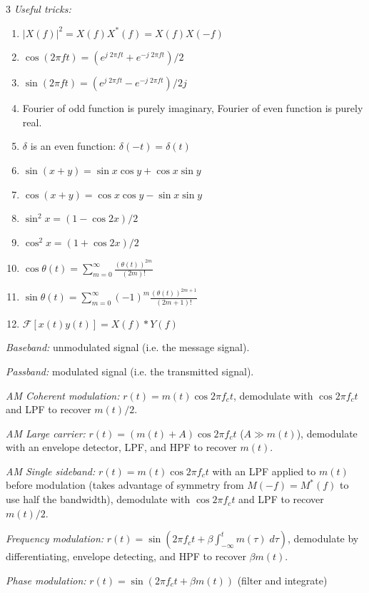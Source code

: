 \documentclass[9pt]{article}
\newcommand{\abs}[1]{\left\vert #1 \right\vert}
\newcommand{\F}{\mathcal{F}}
\begin{document}
\begin{multicols}{3}
\emph{Useful tricks:}
\begin{enumerate}
    \item $\abs{X(f)}^2 = X(f) X^*(f) = X(f) X(-f)$
    \item $\cos(2\pi f t) = (e^{j\; 2\pi f t} + e^{-j\; 2\pi f t})/2$
    \item $\sin(2\pi f t) = (e^{j\; 2\pi f t} - e^{-j\; 2\pi f t})/2j$
    \item Fourier of odd function is purely imaginary, Fourier of even function is purely real.
    \item $\delta$ is an even function: $\delta(-t) = \delta(t)$
    \item $\sin(x + y) = \sin x \cos y + \cos x \sin y$
    \item $\cos(x + y) = \cos x \cos y - \sin x \sin y$
    \item $\sin^2 x = (1 - \cos 2 x)/2$
    \item $\cos^2 x = (1 + \cos 2x)/ 2$
    \item $\cos \theta(t) = \sum_{m=0}^{\infty} \frac{(\theta(t))^{2m}}{(2m)!}$
    \item $\sin \theta(t) = \sum_{m=0}^{\infty} (-1)^m \frac{(\theta(t))^{2m+1}}{(2m + 1)!}$
    \item $\F[x(t)y(t)] = X(f) * Y(f)$
\end{enumerate}

\emph{Baseband:} unmodulated signal (i.e. the message signal).

\emph{Passband:} modulated signal (i.e. the transmitted signal).

\emph{AM Coherent modulation:} $r(t) = m(t) \cos 2\pi f_c t$, demodulate with $\cos 2\pi f_c t$ and LPF to recover $m(t)/2$.

\emph{AM Large carrier:} $r(t) = (m(t) + A) \cos 2\pi f_c t$ ($A \gg m(t)$), demodulate with an envelope detector, LPF, and HPF to recover $m(t)$.

\emph{AM Single sideband:} $r(t) = m(t) \cos 2\pi f_c t$ with an LPF applied to $m(t)$ before modulation (takes advantage of symmetry from $M(-f) = M^*(f)$ to use half the bandwidth), demodulate with $\cos 2\pi f_c t$ and LPF to recover $m(t)/2$.

\emph{Frequency modulation:} $r(t) = \sin (2\pi f_c t + \beta \int_{-\infty}^t m(\tau)\; d\tau)$, demodulate by differentiating, envelope detecting, and HPF to recover $\beta m(t)$.

\emph{Phase modulation:} $r(t) = \sin (2\pi f_c t + \beta m(t))$ (filter and integrate)


\end{multicols}
\end{document}
